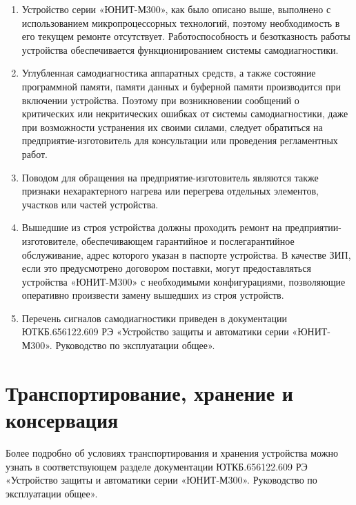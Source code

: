 \documentclass[a4paper, 12pt, table, hidelinks, DIV=calc]{extarticle}
\begin{document}
\begin{enumerate}[label=\arabic{section}.\arabic{subsection}.\arabic*, labelsep=4pt, leftmargin=0pt, itemindent=57pt]

\item
Устройство серии «ЮНИТ-М300», как было описано выше, выполнено с использованием микропроцессорных технологий, поэтому необходимость в его текущем ремонте отсутствует. Работоспособность и безотказность работы устройства обеспечивается функционированием системы самодиагностики.
\item
Углубленная самодиагностика аппаратных средств, а также состояние программной памяти, памяти данных  и  буферной  памяти  производится  при  включении  устройства.  Поэтому  при  возникновении сообщений о критических или некритических ошибках от системы самодиагностики, даже при возможности устранения  их  своими  силами,  следует  обратиться  на  предприятие-изготовитель для  консультации или проведения регламентных работ.
\item 
Поводом  для  обращения  на  предприятие-изготовитель  являются  также  признаки  нехарактерного нагрева или перегрева отдельных элементов, участков или частей устройства.
\item
Вышедшие  из  строя  устройства  должны  проходить  ремонт  на  предприятии-изготовителе, обеспечивающем  гарантийное  и  послегарантийное  обслуживание, адрес которого  указан  в  паспорте устройства.  В  качестве  ЗИП,  если  это  предусмотрено  договором  поставки,  могут  предоставляться устройства  «ЮНИТ-М300» с необходимыми  конфигурациями,  позволяющие  оперативно  произвести  замену вышедших из строя устройств.
\item
Перечень сигналов самодиагностики приведен в документации ЮТКБ.656122.609 РЭ «Устройство защиты и автоматики серии «ЮНИТ-М300». Руководство по эксплуатации общее».
\end{enumerate}


\vspace{5mm}
\color{unidarkgreen}\section[Транспортирование, хранение и консервация]{Транспортирование, хранение и консервация}\label{sec:trans}
\color{black}


Более подробно об условиях транспортирования и хранения устройства можно узнать в соответствующем разделе документации ЮТКБ.656122.609 РЭ «Устройство защиты и автоматики серии «ЮНИТ-М300». Руководство по эксплуатации общее». 
\end{document}

